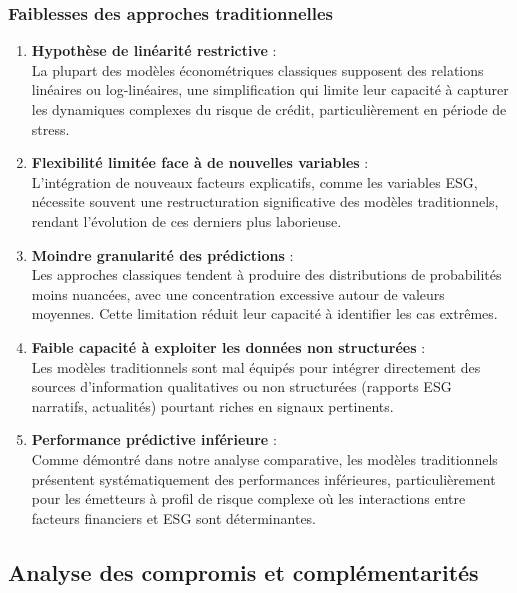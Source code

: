 \subsubsection{Faiblesses des approches traditionnelles}

\begin{enumerate}
  \item \textbf{Hypothèse de linéarité restrictive} : \\
  La plupart des modèles économétriques classiques supposent des relations linéaires ou log-linéaires, une simplification qui limite leur capacité à capturer les dynamiques complexes du risque de crédit, particulièrement en période de stress.

  \item \textbf{Flexibilité limitée face à de nouvelles variables} : \\
  L'intégration de nouveaux facteurs explicatifs, comme les variables ESG, nécessite souvent une restructuration significative des modèles traditionnels, rendant l'évolution de ces derniers plus laborieuse.

  \item \textbf{Moindre granularité des prédictions} : \\
  Les approches classiques tendent à produire des distributions de probabilités moins nuancées, avec une concentration excessive autour de valeurs moyennes. Cette limitation réduit leur capacité à identifier les cas extrêmes.

  \item \textbf{Faible capacité à exploiter les données non structurées} : \\
  Les modèles traditionnels sont mal équipés pour intégrer directement des sources d'information qualitatives ou non structurées (rapports ESG narratifs, actualités) pourtant riches en signaux pertinents.

  \item \textbf{Performance prédictive inférieure} : \\
  Comme démontré dans notre analyse comparative, les modèles traditionnels présentent systématiquement des performances inférieures, particulièrement pour les émetteurs à profil de risque complexe où les interactions entre facteurs financiers et ESG sont déterminantes.
\end{enumerate}

\subsection{Analyse des compromis et complémentarités}

